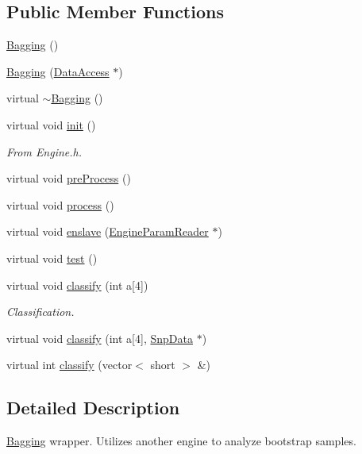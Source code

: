 \subsection*{Public Member Functions}
\begin{DoxyCompactItemize}
\item 
\hyperlink{classBagging_a3af2b221856ad4c4d4e2ef06441fcc84}{Bagging} ()
\item 
\hyperlink{classBagging_a144056cea8677b2365c3c15e87f5d38c}{Bagging} (\hyperlink{classDataAccess}{DataAccess} $\ast$)
\item 
virtual \hyperlink{classBagging_a25ed2b1fad2c85b4d3e562d7a332d369}{$\sim$Bagging} ()
\item 
virtual void \hyperlink{classBagging_ab58c678f776356ae4b4c1c41dcdf3778}{init} ()
\begin{DoxyCompactList}\small\item\em From Engine.h. \item\end{DoxyCompactList}\item 
virtual void \hyperlink{classBagging_a638e97695ee9a685cfee7ce459c2b8f8}{preProcess} ()
\item 
virtual void \hyperlink{classBagging_ab732c0768147c13071d4fc23d879dfd4}{process} ()
\item 
virtual void \hyperlink{classBagging_aa1f58fca264385a46fa7c14a5620488c}{enslave} (\hyperlink{classEngineParamReader}{EngineParamReader} $\ast$)
\item 
virtual void \hyperlink{classBagging_afd3022e8be01cba7f97fc9f81cda8016}{test} ()
\item 
virtual void \hyperlink{classBagging_a02227120bc610a21f39f2454ac03ec7b}{classify} (int a\mbox{[}4\mbox{]})
\begin{DoxyCompactList}\small\item\em Classification. \item\end{DoxyCompactList}\item 
virtual void \hyperlink{classBagging_a9b17e15983996f8ae3b39564e7c3deba}{classify} (int a\mbox{[}4\mbox{]}, \hyperlink{classSnpData}{SnpData} $\ast$)
\item 
virtual int \hyperlink{classBagging_a92072d6610e9b9d932d10a123cc6ff18}{classify} (vector$<$ short $>$ \&)
\end{DoxyCompactItemize}


\subsection{Detailed Description}
\hyperlink{classBagging}{Bagging} wrapper. Utilizes another engine to analyze bootstrap samples.

